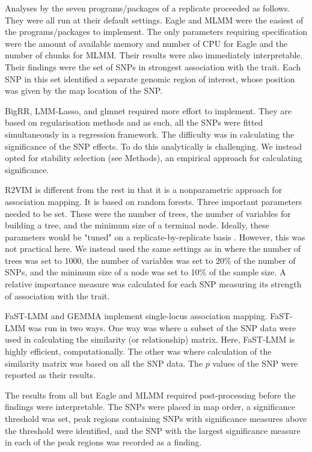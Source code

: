 \documentclass{article}
\begin{document}
 Analyses by the seven programs/packages of a replicate proceeded as follows. They were all run at their default settings. 
 Eagle and MLMM were the easiest of the programs/packages to implement. 
 The only parameters requiring specification were the amount of available memory and number of CPU for 
 Eagle and the number of chunks for MLMM. 
 Their results were also immediately 
 interpretable. Their findings were the set of SNPs in strongest association with the trait. Each 
SNP in this set identified a separate genomic region of interest, whose position was given by the map location of the SNP.  

BigRR, LMM-Lasso, and glmnet required more effort to implement. They are based on regularisation methods and as such, all the SNPs were fitted simultaneously in a regression 
framework. The difficulty was in calculating the significance of the SNP effects. To do this analytically is challenging. We instead opted for stability selection (see Methods),  
an empirical approach for calculating significance. 

R2VIM is different from the rest in that it is a nonparametric approach for association mapping. It is based on random forests. Three important parameters needed to be  set. 
These were the number of trees, the number of variables for building a tree, and the minimum size of a terminal node. Ideally, these parameters would be "tuned" on a replicate-by-replicate 
basis \cite{boulesteix2012overview}. However, this was not practical here. We instead used the same settings as in \cite{szymczak2016r2vim} where 
the number of trees was set to 1000, the number of variables was set to 20\% of the number of SNPs, and 
  the minimum size of a node was set to 10\% of the sample size.
A relative importance measure was calculated 
for each SNP measuring its strength of association with the trait.

FaST-LMM and GEMMA implement single-locus association mapping. FaST-LMM was run in two ways. One way was where a subset of the SNP data were used in calculating the similarity (or relationship) matrix. Here, FaST-LMM is highly efficient, computationally. The other was where calculation of the similarity matrix was based on all the SNP data. The $p$ values of the SNP were reported as their results. 


The results from all but Eagle and MLMM required post-processing before the findings were interpretable.  The SNPs were placed in map order, 
a significance threshold was set, peak regions containing SNPs with significance measures above the threshold were identified, and the SNP with the largest 
significance measure in each of the peak regions was recorded as a finding. 
\end{document}
